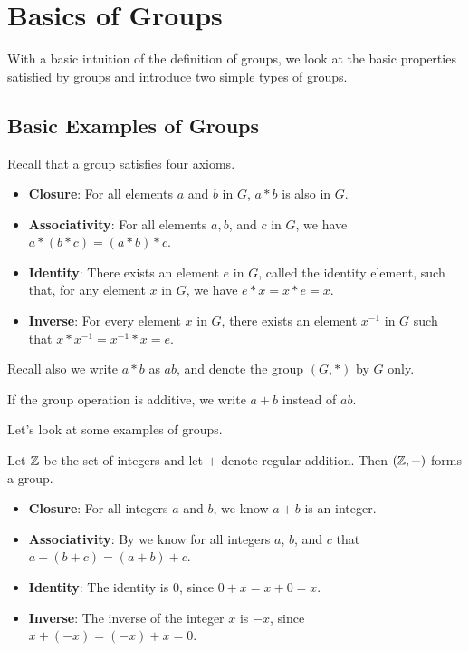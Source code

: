 \chapter{Basics of Groups}
With a basic intuition of the definition of groups, we look at the basic properties satisfied by groups and introduce two simple types of groups.

\section{Basic Examples of Groups}
Recall that a group satisfies four axioms.
\begin{itemize}
    \item \textbf{Closure}: For all elements $a$ and $b$ in $G$, $a \ast b$ is also in $G$.
    \item \textbf{Associativity}: For all elements $a, b$, and $c$ in $G$, we have $a \ast (b \ast c) = (a \ast b) \ast c$.
    \item \textbf{Identity}: There exists an element $e$ in $G$, called the identity element, such that, for any element $x$ in $G$, we have $e \ast x = x \ast e = x$.
    \item \textbf{Inverse}: For every element $x$ in $G$, there exists an element $x^{-1}$ in $G$ such that $x \ast x^{-1} = x^{-1} \ast x = e$.
\end{itemize}

Recall also we write $a \ast b$ as $ab$, and denote the group $(G, \ast)$ by $G$ only.
\begin{remark}
    If the group operation is additive, we write $a + b$ instead of $ab$.
\end{remark}

Let's look at some examples of groups.
\begin{example}
    Let $\mathbb{Z}$ be the set of integers and let $+$ denote regular addition. Then $(\mathbb{Z}, +)$ forms a group.
    \begin{itemize}
        \item \textbf{Closure}: For all integers $a$ and $b$, we know $a + b$ is an integer.
        \item \textbf{Associativity}: By  we know for all integers $a$, $b$, and $c$ that $a + (b + c) = (a + b) + c$.
        \item \textbf{Identity}: The identity is 0, since $0 + x = x + 0 = x$.
        \item \textbf{Inverse}: The inverse of the integer $x$ is $-x$, since $x + (-x) = (-x) + x = 0$.
    \end{itemize}
\end{example}

